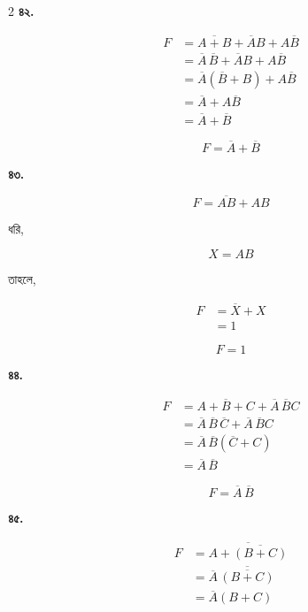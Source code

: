 \begin{multicols}{2}
\textbf{৪২.}

\[
\begin{aligned}
F
&=\overline{A+B}+\overline AB+A\overline B\\
&=\overline A\,\overline B+\overline AB
+A\overline B\\
&=\overline A(\overline B+B)+A\overline B\\
&=\overline A+A\overline B\\
&=\overline A+\overline B
\end{aligned}
\]

\[
\boxed{F=\overline A+\overline B}
\]

\medskip


\textbf{৪৩.}

\[
F=\overline{AB}+AB
\]

ধরি,

\[
X=AB
\]

তাহলে,

\[
\begin{aligned}
F
&=\overline X+X\\
&=1
\end{aligned}
\]

\[
\boxed{F=1}
\]

\medskip


\textbf{৪৪.}

\[
\begin{aligned}
F
&=\overline{A+B+C}
+\overline A\,\overline BC\\
&=\overline A\,\overline B\,\overline C
+\overline A\,\overline BC\\
&=\overline A\,\overline B(\overline C+C)\\
&=\overline A\,\overline B
\end{aligned}
\]

\[
\boxed{F=\overline A\,\overline B}
\]

\medskip


\textbf{৪৫.}

\[
\begin{aligned}
F
&=\overline{A+\overline{(B+C)}}\\
&=\overline A\,
\overline{\overline{(B+C)}}\\
&=\overline A(B+C)
\end{aligned}
\]


\end{multicols}
